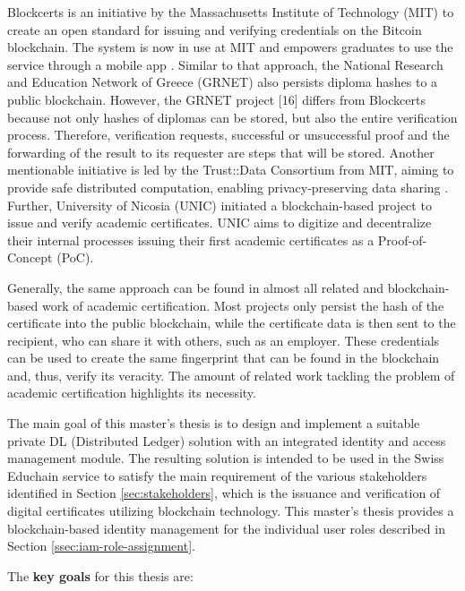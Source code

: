 Blockcerts \cite{mit-digital-diploma} is an initiative by the Massachusetts Institute of Technology (MIT) to create an
open standard for issuing and verifying credentials on the Bitcoin blockchain. The system is now in use
at MIT \cite{mit-digital-diploma} and empowers graduates to use the service through a mobile app \cite{blockcerts}. Similar to that
approach, the National Research and Education Network of Greece (GRNET) \cite{cardano-diplomas} also persists diploma
hashes to a public blockchain. However, the GRNET project [16] differs from Blockcerts because not
only hashes of diplomas can be stored, but also the entire verification process. Therefore, verification
requests, successful or unsuccessful proof and the forwarding of the result to its requester are steps
that will be stored. Another mentionable initiative is led by the Trust::Data Consortium \cite{mit-trust} from MIT,
aiming to provide safe distributed computation, enabling privacy-preserving data sharing \cite{mit-trust}. Further, University of Nicosia (UNIC) \cite{unic-certificates} initiated a blockchain-based project to issue and verify academic certificates.
UNIC aims to digitize and decentralize their internal processes issuing their first academic certificates
as a Proof-of-Concept (PoC).

Generally, the same approach can be found in almost all related and blockchain-based work of academic certification. Most projects only persist the hash of the certificate into the public blockchain, while the certificate data is then sent to the recipient, who can share it with others, such as an employer. These credentials can be used to create the same fingerprint that can be found in the blockchain and, thus, verify its veracity. The amount of related work tackling the problem of academic certification highlights its necessity.

The main goal of this master's thesis is to design and implement a suitable private DL (Distributed Ledger) solution with an integrated identity and access management module. The resulting solution is intended to be used in the Swiss Educhain service \cite{educhain-proposal} to satisfy the main requirement of the various stakeholders identified in Section \ref{sec:stakeholders}, which is the issuance and verification of digital certificates utilizing blockchain technology. This master's thesis provides a blockchain-based identity management for the individual user roles described in Section \ref{ssec:iam-role-assignment}.

The \textbf{key goals} for this thesis are:

